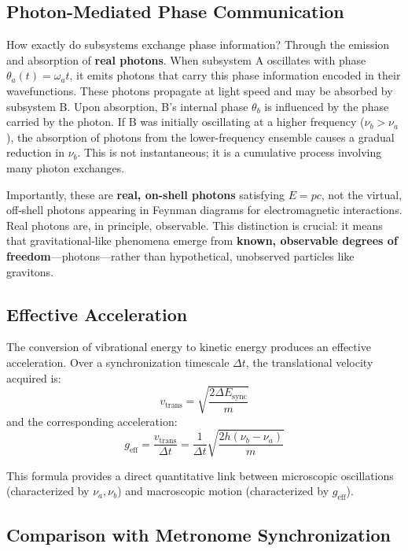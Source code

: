 \documentclass[12pt,letterpaper]{article}
\begin{document}
\subsection{Photon-Mediated Phase Communication}
\label{subsec:photon_communication}
How exactly do subsystems exchange phase information? Through the emission and absorption of \textbf{real photons}. When subsystem A oscillates with phase $\theta_a(t) = \omega_a t$, it emits photons that carry this phase information encoded in their wavefunctions. These photons propagate at light speed and may be absorbed by subsystem B. Upon absorption, B's internal phase $\theta_b$ is influenced by the phase carried by the photon. If B was initially oscillating at a higher frequency ($\nu_b > \nu_a$), the absorption of photons from the lower-frequency ensemble causes a gradual reduction in $\nu_b$. This is not instantaneous; it is a cumulative process involving many photon exchanges.

Importantly, these are \textbf{real, on-shell photons} satisfying $E = pc$, not the virtual, off-shell photons appearing in Feynman diagrams for electromagnetic interactions. Real photons are, in principle, observable. This distinction is crucial: it means that gravitational-like phenomena emerge from \textbf{known, observable degrees of freedom}---photons---rather than hypothetical, unobserved particles like gravitons.


\subsection{Effective Acceleration}
\label{subsec:effective_acceleration}

The conversion of vibrational energy to kinetic energy produces an effective acceleration. Over a synchronization timescale $\Delta t$, the translational velocity acquired is:
\begin{equation}
v_\text{trans} = \sqrt{\frac{2 \Delta E_\text{sync}}{m}}
\end{equation}
and the corresponding acceleration:
\begin{equation}
g_\text{eff} = \frac{v_\text{trans}}{\Delta t} = \frac{1}{\Delta t} \sqrt{\frac{2 h (\nu_b - \nu_a)}{m}}
\end{equation}

This formula provides a direct quantitative link between microscopic oscillations (characterized by $\nu_a, \nu_b$) and macroscopic motion (characterized by $g_\text{eff}$).

\subsection{Comparison with Metronome Synchronization}
\label{subsec:metronome_comparison}
\end{document}
